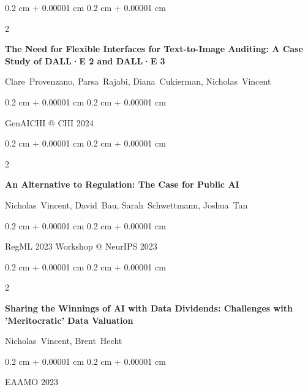\documentclass[10pt, letterpaper]{article}
\newenvironment{onecolentry}{
    \begin{adjustwidth}{
        0.2 cm + 0.00001 cm
    }{
        0.2 cm + 0.00001 cm
    }
}{
    \end{adjustwidth}
} %
\newenvironment{twocolentry}[2][]{
    \onecolentry
    \def\secondColumn{#2}
    \setcolumnwidth{\fill, 4.1 cm}
    \begin{paracol}{2}
}{
    \switchcolumn \raggedleft \secondColumn
    \end{paracol}
    \endonecolentry
} %
\begin{document}
        \begin{samepage}
            \begin{twocolentry}{
                2024
            }
                \textbf{The Need for Flexible Interfaces for Text-to-Image Auditing: A Case Study of DALL·E 2 and DALL·E 3}

                \vspace{0.10 cm}

                \mbox{Clare Provenzano}, \mbox{Parsa Rajabi}, \mbox{Diana Cukierman}, \mbox{Nicholas Vincent}
            \end{twocolentry}


            \vspace{0.10 cm}

            \begin{onecolentry}
        GenAICHI @ CHI 2024    \end{onecolentry}
        \end{samepage}

        \vspace{0.2 cm}

        \begin{samepage}
            \begin{twocolentry}{
                2023
            }
                \textbf{An Alternative to Regulation: The Case for Public AI}

                \vspace{0.10 cm}

                \mbox{Nicholas Vincent}, \mbox{David Bau}, \mbox{Sarah Schwettmann}, \mbox{Joshua Tan}
            \end{twocolentry}


            \vspace{0.10 cm}

            \begin{onecolentry}
        RegML 2023 Workshop @ NeurIPS 2023    \end{onecolentry}
        \end{samepage}

        \vspace{0.2 cm}

        \begin{samepage}
            \begin{twocolentry}{
                2023
            }
                \textbf{Sharing the Winnings of AI with Data Dividends: Challenges with 'Meritocratic' Data Valuation}

                \vspace{0.10 cm}

                \mbox{Nicholas Vincent}, \mbox{Brent Hecht}
            \end{twocolentry}


            \vspace{0.10 cm}

            \begin{onecolentry}
        EAAMO 2023    \end{onecolentry}
        \end{samepage}
\end{document}
